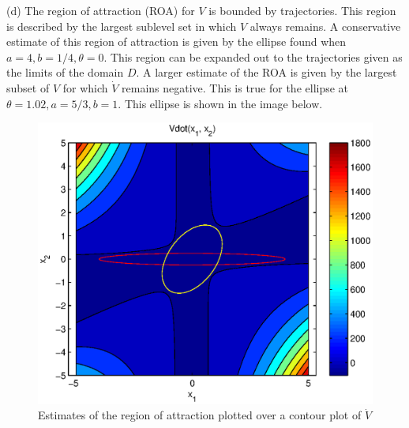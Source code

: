 \documentclass[paper=a4, fontsize=11pt]{scrartcl} %
\numberwithin{equation}{section} %
\numberwithin{figure}{section} %
\numberwithin{table}{section} %
\begin{document}
(d) The region of attraction (ROA) for $V$ is bounded by trajectories. This region is described by the largest sublevel set in which ${V}$ always remains. A conservative estimate of this region of attraction is given by the ellipse found when $a=4, b=1/4, \theta=0$. This region can be expanded out to the trajectories given as the limits of the domain $D$. A larger estimate of the ROA is given by the largest subset of $V$ for which $\dot{V}$ remains negative. This is true for the ellipse at $\theta=1.02, a = 5/3, b= 1$. This ellipse is shown in the image below.

\begin{figure}[h!]
\label{contour2}
\centering
\includegraphics[scale=0.75]{prob3_ROA}
\caption{Estimates of the region of attraction plotted over a contour plot of $\dot{V}$}
\end{figure} 





\newpage

\newpage
\end{document}
